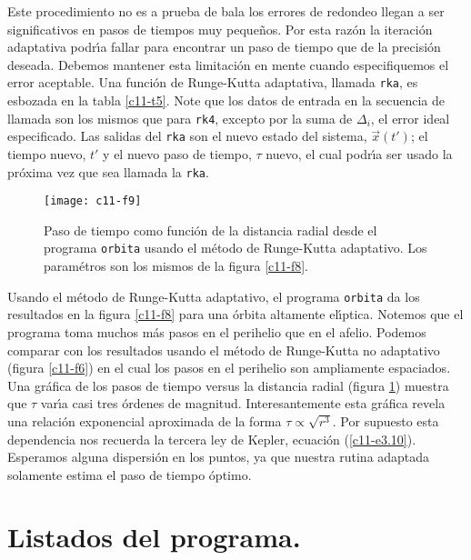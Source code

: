 Este procedimiento no es a prueba de bala los errores de redondeo
llegan a ser significativos en pasos de tiempos muy peque{\~n}os. Por esta
raz{\'o}n la iteraci{\'o}n adaptativa podr{\'\i}a fallar para encontrar un paso de
tiempo que de la precisi{\'o}n deseada. Debemos mantener esta limitaci{\'o}n
en mente cuando especifiquemos el error aceptable.  Una funci{\'o}n de
Runge-Kutta adaptativa, llamada \verb|rka|, es esbozada en la tabla
\ref{c11-t5}.  Note que los datos de entrada en la secuencia de
llamada son los mismos que para \verb|rk4|, excepto por la suma de
$\Delta_i$, el error ideal especificado. Las salidas del \verb|rka| son el
nuevo estado del sistema, $\vec x(t')$; el tiempo nuevo, $t'$ y el
nuevo paso de tiempo, $\tau$ nuevo, el cual podr{\'\i}a ser usado la pr{\'o}xima
vez que sea llamada la \verb|rka|.

\begin{figure}[!h]
\begin{center}
\texttt{[image: c11-f9]}
\caption{Paso de tiempo como funci{\'o}n de la distancia radial desde el
  programa {\tt orbita} usando el m{\'e}todo de Runge-Kutta adaptativo.
  Los param{\'e}tros son los mismos de la figura
  \ref{c11-f8}.}\label{c11-f9}
\end{center}
\end{figure}


Usando el m{\'e}todo de Runge-Kutta adaptativo, el programa \verb|orbita|
da los resultados en la figura \ref{c11-f8} para una {\'o}rbita altamente
el{\'\i}ptica.  Notemos que el programa toma muchos m{\'a}s pasos en el
perihelio que en el afelio. Podemos comparar con los resultados usando
el m{\'e}todo de Runge-Kutta no adaptativo (figura \ref{c11-f6}) en el
cual los pasos en el perihelio son ampliamente espaciados. Una gr{\'a}fica
de los pasos de tiempo versus la distancia radial (figura
\ref{c11-f9}) muestra que $\tau$ var{\'\i}a casi tres {\'o}rdenes de magnitud.
Interesantemente esta gr{\'a}fica revela una relaci{\'o}n exponencial
aproximada de la forma $\tau \propto \sqrt{r^3}$.  Por supuesto esta
dependencia nos recuerda la tercera ley de Kepler, ecuaci{\'o}n
(\ref{c11-e3.10}). Esperamos alguna dispersi{\'o}n en los puntos, ya que
nuestra rutina adaptada solamente estima el paso de tiempo {\'o}ptimo.

\section{Listados del programa.}

